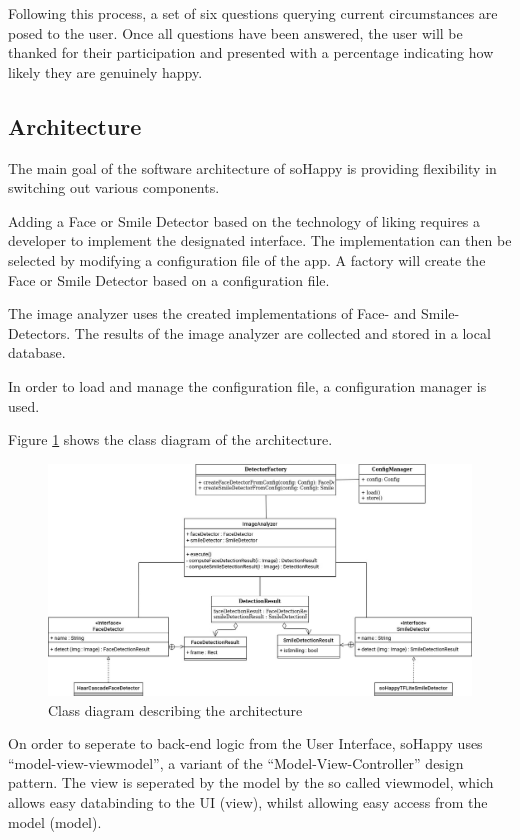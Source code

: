 Following this process, a set of six questions querying current circumstances are posed to the user. Once all questions have been answered, the user will be thanked for their participation and presented with a percentage indicating how likely they are genuinely happy.

\subsection{Architecture}

The main goal of the software architecture of soHappy is providing flexibility 
in switching out various components.

Adding a Face or Smile Detector based on the technology of liking requires a
developer to implement the designated interface. The implementation can then be 
selected by modifying a configuration file of the app. A factory will create 
the Face or Smile Detector based on a configuration file. 

The image analyzer uses the created implementations of Face- and Smile-
Detectors. The results of the image analyzer are collected and stored in a
local database.

In order to load and manage the configuration file, a configuration manager 
is used.

Figure \ref{fig:arch1} shows the class diagram of the architecture.

\begin{figure}
    \includegraphics[width=\linewidth]{figures/methodology_architecture_1.jpg}
    \caption{Class diagram describing the architecture}
    \label{fig:arch1}
\end{figure}

On order to seperate to back-end logic from the User Interface, soHappy uses
``model-view-viewmodel'', a variant of the ``Model-View-Controller'' design 
pattern. The view is seperated by the model by the so called viewmodel, which
allows easy databinding to the UI (view), whilst allowing easy access from the
model (model).

